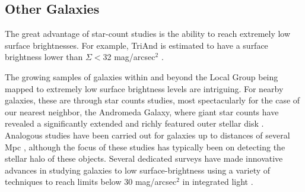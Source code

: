 \documentclass[galaxies,article,submit,moreauthors,pdftex,10pt,a4paper]{mdpi}
\begin{document}


\subsection{Other Galaxies}


The great advantage of star-count studies is the ability to reach extremely low
surface brightnesses. For example, TriAnd is estimated to have a surface
brightness lower than $\Sigma <$32 mag/arcsec$^2$ \cite{majewski04}.


The growing samples of galaxies within and beyond the Local Group being mapped to extremely low surface brightness levels are intriguing.
For nearby galaxies, these are through star counts studies, most spectacularly for the case of our nearest neighbor, the Andromeda Galaxy, where giant star counts have revealed a significantly extended and richly featured outer stellar disk \cite{ferguson02,ibata05}.
Analogous studies have been carried out for galaxies up to distances of several Mpc \cite[e.g.,][]{monachesi13,crnojevi16}, although the focus of these studies has typically been on detecting the stellar halo of these objects.
Several dedicated surveys have made innovative advances in studying galaxies to low surface-brightness using a variety of techniques to reach limits below 30 mag/arcsec$^2$ in integrated light \citep[e.g.][]{delgado10,vandokkum14,duc15}.
\end{document}
